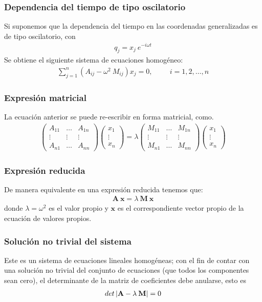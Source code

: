 \begin{frame}
\frametitle{Dependencia del tiempo de tipo oscilatorio }
Si suponemos que la dependencia del tiempo en las coordenadas generalizadas es de tipo oscilatorio, con
\begin{align*}
q_{j} = x_{j} \: e^{-i \omega t}
\end{align*}
\pause
Se obtiene el siguiente sistema de ecuaciones homogéneo:
\begin{align*}
\sum_{j = 1}^{n} \left( A_{i j} -  \omega^{2} \: M_{i j} \right) x_{j} = 0, \hspace{1cm} i = 1, 2, \ldots, n
\end{align*}
\end{frame}
\begin{frame}
\frametitle{Expresión matricial}
La ecuación anterior se puede re-escribir en forma matricial, como.
\begin{align*}
\begin{pmatrix}
A_{11} & \ldots & A_{1n} \\
\vdots & \vdots & \vdots \\
A_{n1} & \ldots & A_{nn}
\end{pmatrix}
\begin{pmatrix}
x_{1} \\
\vdots \\
x_{n}
\end{pmatrix} = \lambda
\begin{pmatrix}
M_{11} & \ldots & M_{1n} \\
\vdots & \vdots & \vdots \\
M_{n1} & \ldots & M_{nn}
\end{pmatrix}
\begin{pmatrix}
x_{1} \\
\vdots \\
x_{n}
\end{pmatrix}
\end{align*}
\end{frame}
\begin{frame}
\frametitle{Expresión reducida}
De manera equivalente en una expresión reducida tenemos que:
\begin{align*}
\mathbf{A \: x} = \lambda \: \mathbf{M \: x}
\end{align*}
donde $\lambda= \omega^{2}$ es el valor propio y $\mathbf{x}$ es el correspondiente vector propio de la ecuación de valores propios.\\
\end{frame}
\begin{frame}
\frametitle{Solución no trivial del sistema}
Este es un sistema de ecuaciones lineales homogéneas; con el fin de contar con una solución no trivial del conjunto de ecuaciones (que todos los componentes sean cero), el determinante de la matriz de coeficientes debe anularse, esto es
\begin{align*}
det \, \abs{ \mathbf{A} - \lambda \: \mathbf{M} }= 0
\end{align*}
\end{frame}
